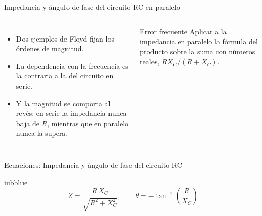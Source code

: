 \documentclass[aspectratio=169,11pt,xcolor={table}]{beamer}
\begin{document}
\begin{frame}{{\normalsize Impedancia y ángulo de fase del circuito RC en paralelo}}
\begin{columns}[c,onlytextwidth]
\small
\begin{itemize}\setlength{\itemsep}{4pt}
  \item Dos ejemplos de Floyd fijan los órdenes de magnitud.
  \item La dependencia con la frecuencia es la contraria a la del circuito en serie.
  \item Y la magnitud se comporta al revés: en serie la impedancia nunca baja de $R$, mientras que en paralelo nunca la supera.
\end{itemize}
\begin{cardO}{Error frecuente}
\footnotesize Aplicar a la impedancia en paralelo la fórmula del producto sobre la suma con números reales, $R X_C / (R + X_C)$.
\end{cardO}
\end{columns}
\end{frame}

\begin{frame}{{\normalsize Ecuaciones: Impedancia y ángulo de fase del circuito RC}}
\begin{cajaplana}{iubblue}
\centering
{\large
\begin{equation*}
  Z = \frac{R\,X_C}{\sqrt{R^{2} + X_C^{2}}}, \qquad \theta = -\tan^{-1}\!\left(\frac{R}{X_C}\right)
\end{equation*}
}
\end{cajaplana}
\end{frame}
\end{document}
